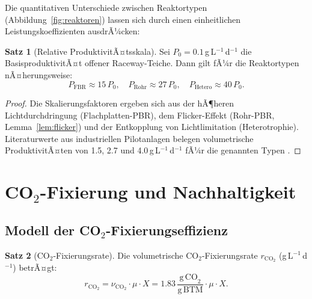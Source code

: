 ﻿\documentclass[a4paper,12pt]{article}
\theoremstyle{definition}
\newtheorem{satz}{Satz}
\begin{document}
Die quantitativen Unterschiede zwischen Reaktortypen (Abbildung~\ref{fig:reaktoren})
lassen sich durch einen einheitlichen Leistungskoeffizienten ausdrÃ¼cken:

\begin{satz}[Relative ProduktivitÃ¤tsskala]
	Sei $P_0 = 0.1$\,g\,L$^{-1}$\,d$^{-1}$ die BasisproduktivitÃ¤t offener
	Raceway-Teiche. Dann gilt fÃ¼r die Reaktortypen nÃ¤herungsweise:
	\[
		P_\mathrm{FBR} \approx 15\,P_0, \quad
		P_\mathrm{Rohr} \approx 27\,P_0, \quad
		P_\mathrm{Hetero} \approx 40\,P_0.
	\]
\end{satz}

\begin{proof}
	Die Skalierungsfaktoren ergeben sich aus der hÃ¶heren Lichtdurchdringung
	(Flachplatten-PBR), dem Flicker-Effekt (Rohr-PBR, Lemma~\ref{lem:flicker})
	und der Entkopplung von Lichtlimitation (Heterotrophie). Literaturwerte
	aus industriellen Pilotanlagen belegen volumetrische ProduktivitÃ¤ten von
	1.5, 2.7 und 4.0\,g\,L$^{-1}$\,d$^{-1}$ fÃ¼r die genannten Typen
	\cite{chisti2007,slegers2011,posten2009}. \qedhere
\end{proof}

\section{CO$_2$-Fixierung und Nachhaltigkeit}

\subsection{Modell der CO$_2$-Fixierungseffizienz}

\begin{satz}[$\mathrm{CO}_2$-Fixierungsrate]
	Die volumetrische CO$_2$-Fixierungsrate $r_{\mathrm{CO}_2}$
	(g\,L$^{-1}$\,d$^{-1}$) betrÃ¤gt:
	\[
		r_{\mathrm{CO}_2} = \nu_{\mathrm{CO}_2} \cdot \mu \cdot X
		= 1.83\,\frac{\mathrm{g\,CO}_2}{\mathrm{g\,BTM}} \cdot \mu \cdot X.
	\]
	\label{satz:co2fix}
\end{satz}
\end{document}

